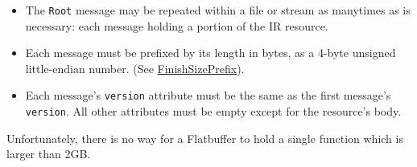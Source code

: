 \begin{appendices}
\begin{itemize}
  \item The \texttt{Root} message may be repeated within a file or stream as manytimes as is necessary: each message holding a portion of the IR resource.
  \item Each message must be prefixed by its length in bytes, as a 4-byte unsigned little-endian number. (See \href{https://google.github.io/flatbuffers/class_flat_buffers_1_1_flat_buffer_builder.html#a425ab2bd13a0e4331a7190ec2d17c3b2}{FinishSizePrefix}).
  \item Each message's \texttt{version} attribute must be the same as the first message's \texttt{version}. All other attributes must be empty except for the resource's body.
\end{itemize}

Unfortunately, there is no way for a Flatbuffer to hold a single function which is larger than 2GB.

\end{appendices}